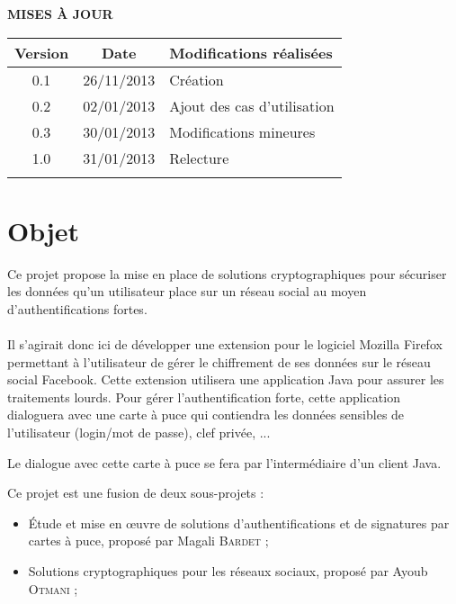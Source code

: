 \documentclass[a4paper,11pt,french]{article}
\begin{document}
\makeFirstPage
\clearpage

\vspace*{1cm}
\begin{center}
\textbf{\huge{MISES À JOUR}}\\
\vspace*{3cm}
	\begin{tabularx}{16cm}{|c|c|X|}
	\hline
	\bfseries{Version} & \bfseries{Date} & \bfseries{Modifications réalisées}\\
	\hline
	0.1 & 26/11/2013 & Création\\
	\hline
    0.2 & 02/01/2013 & Ajout des cas d'utilisation\\
	\hline
    0.3 & 30/01/2013 & Modifications mineures\\
	\hline
    1.0 & 31/01/2013 & Relecture \\
	\hline
	&&\\
	\hline
	\end{tabularx}
\end{center}

\clearpage
\tableofcontents
\clearpage

\section{Objet}
\renewcommand\labelitemi{\textbullet} %
\renewcommand\labelitemii{$\circ$} %
Ce projet propose la mise en place de solutions cryptographiques pour 
sécuriser les données qu’un utilisateur place sur un réseau social au moyen 
d’authentifications fortes.

\paragraph{}
Il s’agirait donc ici de développer une extension pour le logiciel Mozilla 
Firefox permettant à l’utilisateur de gérer le chiffrement de ses données sur 
le réseau social Facebook. Cette extension utilisera
une application Java pour assurer les traitements lourds. Pour gérer 
l’authentification forte, cette application dialoguera avec une carte à puce 
qui contiendra les données sensibles de l’utilisateur (login/mot de passe), 
clef privée, ...

Le dialogue avec cette carte à puce se fera par l’intermédiaire d’un 
client Java. 

Ce projet est une fusion de deux sous-projets :
\begin{itemize}
    \item Étude et mise en \oe{}uvre de solutions d’authentifications et de signatures 
        par cartes à puce, proposé par Magali \textsc{Bardet} ;
\item Solutions cryptographiques pour les réseaux sociaux, proposé par Ayoub 
    \textsc{Otmani} ;
\end{itemize}
\end{document}
